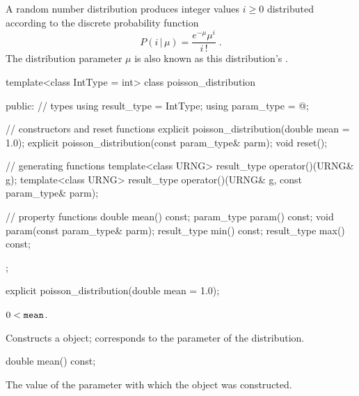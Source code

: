 \pnum
A  random number distribution
produces integer values $ i \geq 0 $
distributed according to
the discrete probability function
%
\[%
 P(i\,|\,\mu)
      = \frac{ e^{-\mu} \mu^{i} }
             { i\,! }
\; \mbox{.}
\]
The distribution parameter $\mu$
is also known as this distribution's %
%
%
.

\begin{codeblock}
template<class IntType = int>
 class poisson_distribution
{
public:
 // types
 using result_type = IntType;
 using param_type  = @\unspec@;

 // constructors and reset functions
 explicit poisson_distribution(double mean = 1.0);
 explicit poisson_distribution(const param_type& parm);
 void reset();

 // generating functions
 template<class URNG>
   result_type operator()(URNG& g);
 template<class URNG>
   result_type operator()(URNG& g, const param_type& parm);

 // property functions
 double mean() const;
 param_type param() const;
 void param(const param_type& parm);
 result_type min() const;
 result_type max() const;
};
\end{codeblock}



%
\begin{itemdecl}
explicit poisson_distribution(double mean = 1.0);
\end{itemdecl}

\begin{itemdescr}
\pnum\requires
 $ 0 < \texttt{mean} $.

\pnum\effects Constructs a  object;
 corresponds to the parameter of the distribution.
\end{itemdescr}

%
%
\begin{itemdecl}
double mean() const;
\end{itemdecl}

\begin{itemdescr}
\pnum\returns The value of the  parameter
 with which the object was constructed.
\end{itemdescr}


